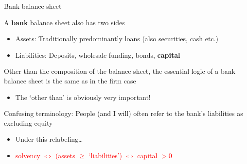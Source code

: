 \begin{frame}{Bank balance sheet}

A \textbf{bank} balance sheet also has two sides
	\begin{itemize}
	\item	Assets: Traditionally predominantly loans (also securities, cash etc.)
	\item	Liabilities: Deposits, wholesale funding, bonds, \textbf{capital}
	\end{itemize}
\vspace{2mm}
Other than the composition of the balance sheet, the essential logic of a bank balance sheet is the same as in the firm case
	\begin{itemize}
	\item	The `other than' is obviously very important!
	\end{itemize} 
\vspace{2mm}
Confusing terminology: People (and I will) often refer to the bank's liabilities as excluding equity
	\begin{itemize}
	\item	Under this relabeling\ldots
	\vspace{1mm}
	\item[]	\centering \textcolor{red}{solvency $\Leftrightarrow$ (assets $\geq$ `liabilities') $\Leftrightarrow$ capital $>0$}
	\end{itemize}

\end{frame}



